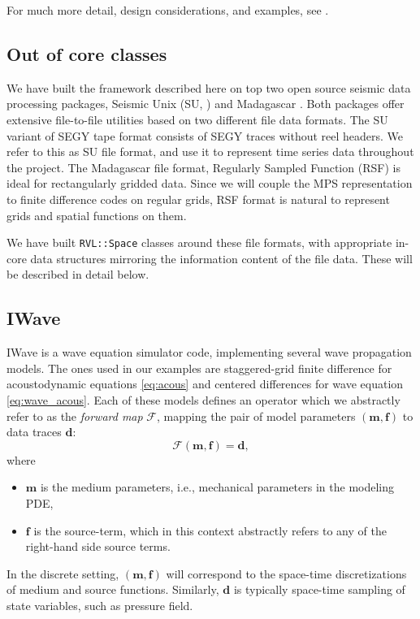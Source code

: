 For much more detail, design considerations, and examples, see
\cite{RVLTOMS}.

\subsection{Out of core classes}

We have built the framework described here on top two open source seismic data processing packages, Seismic Unix
(SU, \cite[]{SU44}) and Madagascar \cite[]{Madagascar}. Both packages offer extensive file-to-file
utilities based on two different file data formats. The SU variant of SEGY tape format consists of
SEGY traces without reel headers. We refer to this as SU file format,
and use it to represent time series data throughout the project. The
Madagascar file format, Regularly Sampled Function (RSF) is ideal
for rectangularly gridded data. Since we will couple the MPS
representation to finite difference codes on regular grids, RSF format
is natural to represent grids and spatial functions on  them.

We have built {\tt RVL::Space} classes around these file formats, with
appropriate in-core data structures mirroring the information content
of the file data. These will be described in detail below. 

\subsection{IWave}

IWave is a wave equation simulator code, implementing several wave propagation models. 
The ones used in our examples are staggered-grid finite difference for acoustodynamic equations \ref{eq:acous} \citep{Vir:84} and centered differences for wave equation \ref{eq:wave_acous}. 
Each of these models defines an operator which we abstractly refer to as the {\em forward map} $\mathcal F$, mapping the pair of model parameters $(\mathbf m,\mathbf f)$ to data traces $\mathbf d$:
\begin{equation} \label{eq:fwdmodel}
	\mathcal F(\mathbf m,\mathbf f) = \mathbf d,
\end{equation}
where
\begin{itemize}
	\item $\mathbf m$ is the medium parameters, i.e., mechanical parameters in the modeling PDE,
	\item $\mathbf f$ is the source-term, which in this context abstractly refers to any of the right-hand side source terms.
\end{itemize}	
In the discrete setting, $(\mathbf m,\mathbf f)$ will correspond to the space-time discretizations of medium and source functions.
Similarly, $\mathbf d$ is typically space-time sampling of state variables, such as pressure field.

